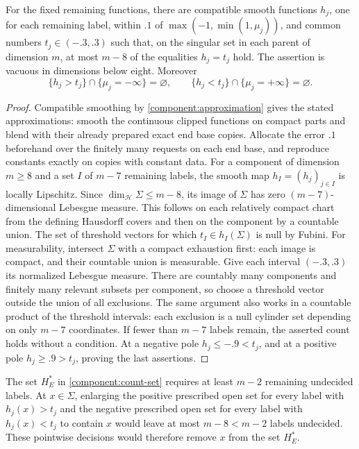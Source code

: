 \begin{lemma}\label{local:smooth-approximations}
For the fixed remaining functions, there are compatible smooth
functions $h_j$, one for each remaining label,
within $.1$ of $\max(-1,\min(1,\mu_j))$, and common numbers
$t_j\in(-.3,.3)$ such that, on the singular set in each parent of
dimension $m$, at most $m-8$ of the equalities $h_j=t_j$ hold.
The assertion is vacuous in dimensions below eight.  Moreover
\[
 \{h_j>t_j\}\cap\{\mu_j=-\infty\}=\varnothing,
 \qquad
 \{h_j<t_j\}\cap\{\mu_j=+\infty\}=\varnothing.
\]
\end{lemma}
\begin{proof}
Compatible smoothing by \cref{component:approximation} gives the stated
approximations: smooth the continuous clipped functions on compact
parts and blend with their already prepared exact end base copies.
Allocate the error $.1$ beforehand over the finitely many requests
on each end base, and reproduce constants exactly on copies with constant data.
For a component of dimension $m\ge8$ and a set $I$ of $m-7$
remaining labels, the smooth map $h_I=(h_j)_{j\in I}$ is locally
Lipschitz.  Since $\dim_{\mathcal H}\Sigma\le m-8$, its image of $\Sigma$
has zero $(m-7)$-dimensional Lebesgue measure.  This follows on each
relatively compact chart from the defining Hausdorff covers and then
on the component by a countable union.  The set of threshold vectors for
which $t_I\in h_I(\Sigma)$ is null by Fubini.  For measurability,
intersect $\Sigma$ with a compact exhaustion first: each image is compact,
and their countable union is measurable.  Give each interval $(-.3,.3)$
its normalized Lebesgue measure.  There are countably many components and
finitely many relevant subsets per component, so choose a threshold vector
outside the union of all exclusions.  The same argument also works in
a countable product of the threshold intervals: each exclusion is a
null cylinder set depending on only $m-7$ coordinates.  If fewer
than $m-7$ labels remain, the asserted count holds without a condition.
At a negative pole $h_j\le-.9<t_j$, and at a positive pole
$h_j\ge.9>t_j$, proving the last assertions.
\end{proof}

The set $H_E^*$ in \eqref{component:count-set} requires at least $m-2$
remaining undecided labels.  At $x\in\Sigma$, enlarging the positive
prescribed open set for every label with $h_j(x)>t_j$ and the negative prescribed open set for every
label with $h_j(x)<t_j$ to contain $x$ would leave at most
$m-8<m-2$ labels undecided.  These pointwise decisions would therefore
remove $x$ from the set $H_E^*$.

